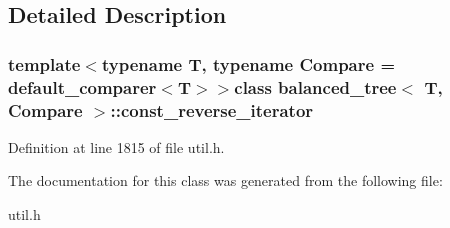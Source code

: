 \subsection{Detailed Description}
\subsubsection*{template$<$typename T, typename Compare = default\+\_\+comparer$<$\+T$>$$>$class balanced\+\_\+tree$<$ T, Compare $>$\+::const\+\_\+reverse\+\_\+iterator}



Definition at line 1815 of file util.\+h.



The documentation for this class was generated from the following file\+:\begin{DoxyCompactItemize}
\item 
util.\+h\end{DoxyCompactItemize}
